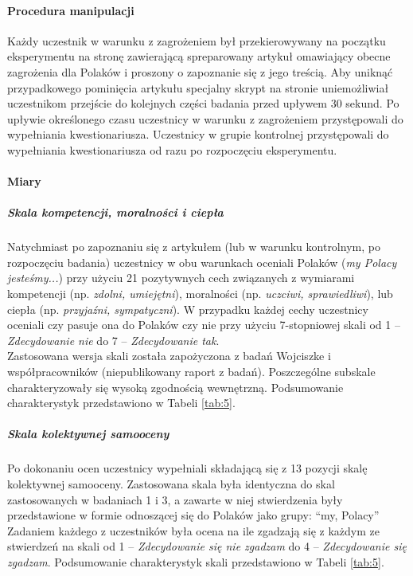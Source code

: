 \documentclass[man]{apa6}
\begin{document}
\paragraph{Procedura manipulacji}
Każdy uczestnik w warunku z zagrożeniem był przekierowywany na początku eksperymentu na stronę zawierającą spreparowany artykuł omawiający obecne zagrożenia dla Polaków i proszony o zapoznanie się z jego treścią. Aby uniknąć przypadkowego pominięcia artykułu specjalny skrypt na stronie uniemożliwiał uczestnikom przejście do kolejnych części badania przed upływem 30 sekund. Po upływie określonego czasu uczestnicy w warunku z zagrożeniem przystępowali do wypełniania kwestionariusza. Uczestnicy w grupie kontrolnej przystępowali do wypełniania kwestionariusza od razu po rozpoczęciu eksperymentu. \\

\paragraph{Miary}
\subparagraph{Skala kompetencji, moralności i ciepła}
Natychmiast po zapoznaniu się z artykułem (lub w warunku kontrolnym, po rozpoczęciu badania) uczestnicy w obu warunkach oceniali Polaków (\emph{my Polacy jesteśmy...}) przy użyciu 21 pozytywnych cech związanych z wymiarami kompetencji (np. \emph{zdolni, umiejętni}), moralności (np. \emph{uczciwi, sprawiedliwi}), lub ciepła (np. \emph{przyjaźni, sympatyczni}). W przypadku każdej cechy uczestnicy oceniali czy pasuje ona do Polaków czy nie przy użyciu 7-stopniowej skali od 1 -- \emph{Zdecydowanie nie} do 7 -- \emph{Zdecydowanie tak}.\\
Zastosowana wersja skali została zapożyczona z badań Wojciszke i współpracowników (niepublikowany raport z badań). Poszczególne subskale charakteryzowały się wysoką zgodnością wewnętrzną. Podsumowanie charakterystyk przedstawiono w Tabeli \ref{tab:5}.

\subparagraph{Skala kolektywnej samooceny}
Po dokonaniu ocen uczestnicy wypełniali składającą się z 13 pozycji skalę kolektywnej samooceny. Zastosowana skala była identyczna do skal zastosowanych w badaniach 1 i 3, a zawarte w niej stwierdzenia były przedstawione w formie odnoszącej się do Polaków jako grupy: ``my, Polacy'' Zadaniem każdego z uczestników była ocena na ile zgadzają się z każdym ze stwierdzeń na skali od 1 -- \emph{Zdecydowanie się nie zgadzam} do 4 -- \emph{Zdecydowanie się zgadzam}. Podsumowanie charakterystyk skali przedstawiono w Tabeli \ref{tab:5}.
\end{document}
